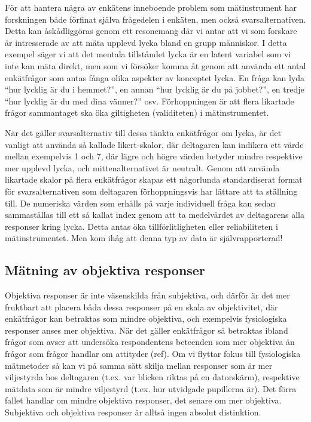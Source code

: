 \documentclass[
]{book}
\begin{document}
För att hantera några av enkätens inneboende problem som mätinstrument har forskningen både förfinat själva frågedelen i enkäten, men också svarsalternativen. Detta kan åskådliggöras genom ett resonemang där vi antar att vi som forskare är intresserade av att mäta upplevd lycka bland en grupp människor. I detta exempel säger vi att det mentala tillståndet lycka är en latent variabel som vi inte kan mäta direkt, men som vi försöker komma åt genom att använda ett antal enkätfrågor som antas fånga olika aspekter av konceptet lycka. En fråga kan lyda ``hur lycklig är du i hemmet?'', en annan ``hur lycklig är du på jobbet?'', en tredje ``hur lycklig är du med dina vänner?'' osv. Förhoppningen är att flera likartade frågor sammantaget ska öka giltigheten (validiteten) i mätinstrumentet.

När det gäller svarsalternativ till dessa tänkta enkätfrågor om lycka, är det vanligt att använda så kallade likert-skalor, där deltagaren kan indikera ett värde mellan exempelvis 1 och 7, där lägre och högre värden betyder mindre respektive mer upplevd lycka, och mittenalternativet är neutralt. Genom att använda likartade skalor på flera enkätfrågor skapas ett någorlunda standardiserat format för svarsalternativen som deltagaren förhoppningsvis har lättare att ta ställning till. De numeriska värden som erhålls på varje individuell fråga kan sedan sammaställas till ett så kallat index genom att ta medelvärdet av deltagarens alla responser kring lycka. Detta antas öka tillförlitligheten eller reliabiliteten i mätinstrumentet. Men kom ihåg att denna typ av data är självrapporterad!

\hypertarget{sub07.3.3}{%
\subsection{Mätning av objektiva responser}\label{sub07.3.3}}

Objektiva responser är inte väsenskilda från subjektiva, och därför är det mer fruktbart att placera båda dessa responser på en skala av objektivitet, där enkätfrågor kan betraktas som mindre objektiva, och exempelvis fysiologiska responser anses mer objektiva. När det gäller enkätfrågor så betraktas ibland frågor som avser att undersöka respondentens beteenden som mer objektiva än frågor som frågor handlar om attityder (ref). Om vi flyttar fokus till fysiologiska mätmetoder så kan vi på samma sätt skilja mellan responser som är mer viljestyrda hos deltagaren (t.ex. var blicken riktas på en datorskärm), respektive mätdata som är mindre viljestyrd (t.ex. hur utvidgade pupillerna är). Det förra fallet handlar om mindre objektiva responser, det senare om mer objektiva. Subjektiva och objektiva responser är alltså ingen absolut distinktion.
\end{document}
